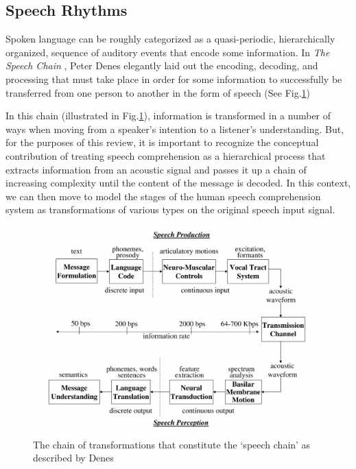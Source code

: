 \documentclass[titlepage]{article}
\begin{document}
  \subsection{Speech Rhythms}

    Spoken language can be roughly categorized as a quasi-periodic, 
    hierarchically organized, sequence of auditory events that encode some 
    information. In \textit{The Speech Chain} \cite{Denes1993}, Peter Denes 
    elegantly laid out the encoding, decoding, and processing that must take 
    place in order for some information to successfully be transferred from one
    person to another in the form of speech (See Fig.\ref{speechChain})

    In this chain (illustrated in Fig.\ref{speechChain}), information
    is transformed in a number of ways when moving from a speaker's intention 
    to a listener's
    understanding. But, for the purposes of this review, it is important to 
    recognize the
    conceptual contribution of treating speech comprehension as a hierarchical 
    process
    that extracts information from an acoustic signal and passes it up a chain 
    of increasing
    complexity until the content of the message is decoded. In this context, 
    we can then move
    to model the stages of the human speech comprehension system as 
    transformations of
    various types on the original speech input signal.

    \begin{figure}
      \centering
      \includegraphics[scale=0.3]{speechChain}
      \caption{The chain of transformations that constitute the `speech chain' as
      described by Denes \cite{Denes1993,Rabiner2007}}
      \label{speechChain}
    \end{figure}
\end{document}
